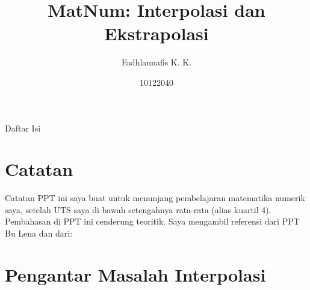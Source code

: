 \documentclass[xcolor={dvipsnames}, 9pt]{beamer}
\title{MatNum: Interpolasi dan Ekstrapolasi}
\author{Fadhlannafis K. K.}
\date{10122040}
\begin{document}
	\begin{frame}[plain]
		\maketitle
	\end{frame}
	\begin{frame}{Daftar Isi}
		\tableofcontents
	\end{frame}
	\section*{Catatan}
	\begin{frame}{Catatan}
		PPT ini saya buat untuk menunjang pembelajaran matematika numerik saya, setelah UTS saya di bawah setengahnya rata-rata (alias kuartil 4). \newline
		Pembahasan di PPT ini cenderung teoritik. Saya mengambil referensi dari PPT Bu Lena dan dari:
		\nocite{*}
		\printbibliography
	\end{frame}
	\section{Pengantar Masalah Interpolasi}
\end{document}
